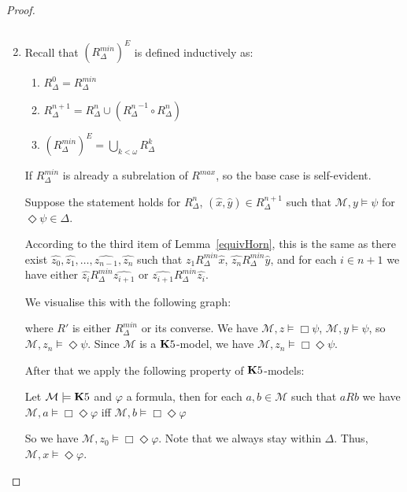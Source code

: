 \documentclass[a4paper]{article}
\theoremstyle{defin}
\theoremstyle{theorem}
\theoremstyle{prop}
\theoremstyle{lemma}
\theoremstyle{fact}
\theoremstyle{exercise}
\theoremstyle{ex}
\theoremstyle{col}
\theoremstyle{claim}
\begin{document}
\begin{proof}
\begin{enumerate}
  $ $

  \item Recall that $(R^{min}_{\Delta})^{E}$ is defined inductively as:
  \begin{enumerate}
    \item $R_{\Delta}^{0} = R_{\Delta}^{min}$
    \item $R_{\Delta}^{n + 1} = R_{\Delta}^{n} \cup ({R_{\Delta}^{n}}^{-1} \circ R_{\Delta}^{n})$
    \item $(R^{min}_{\Delta})^{E} = \bigcup_{k < \omega} R_{\Delta}^{k}$
  \end{enumerate}

  If $R^{min}_{\Delta}$ is already a subrelation of $R^{max}$, so the base case is self-evident.

  Suppose the statement holds for $R_{\Delta}^{n}$, $(\hat{x},\hat{y}) \in R_{\Delta}^{n + 1}$ such that $\mathcal{M}, y \models \psi$ for $\Diamond \psi \in \Delta$.

  According to the third item of Lemma~\ref{equivHorn}, this is the same as there exist $\widehat{z_0}, \widehat{z_1}, \dots, \widehat{z_{n-1}}, \widehat{z_n}$ such that
  $\widehat{z_1} R^{min}_{\Delta} \hat{x}$, $\widehat{z_n} R^{min}_{\Delta} \hat{y}$, and for each $i \in n + 1$ we have either $\widehat{z_i} R^{min}_{\Delta} \widehat{z_{i + 1}}$ or $\widehat{z_{i + 1}} R^{min}_{\Delta} \widehat{z_i}$.

  We visualise this with the following graph:

  where $R'$ is either $R_{\Delta}^{min}$ or its converse. We have $\mathcal{M}, z \models \Box \psi$, $\mathcal{M}, y \models \psi$, so $\mathcal{M}, z_{n} \models \Diamond \psi$. Since $\mathcal{M}$ is a ${\bf K}5$-model, we have $\mathcal{M}, z_{n} \models \Box \Diamond \psi$.

  After that we apply the following property of ${\bf K}5$-models:
  \begin{center}
    Let $\mathcal{M} \models {\bf K}5$ and $\varphi$ a formula, then for each $a, b \in \mathcal{M}$ such that $a R b$ we have $\mathcal{M}, a \models \Box \Diamond \varphi$ iff $\mathcal{M}, b \models \Box \Diamond \varphi$
  \end{center}
  So we have $\mathcal{M}, z_0 \models \Box \Diamond \varphi$. Note that we always stay within $\Delta$. Thus, $\mathcal{M}, x \models \Diamond \varphi$.


\end{enumerate}
\end{proof}
\end{document}
